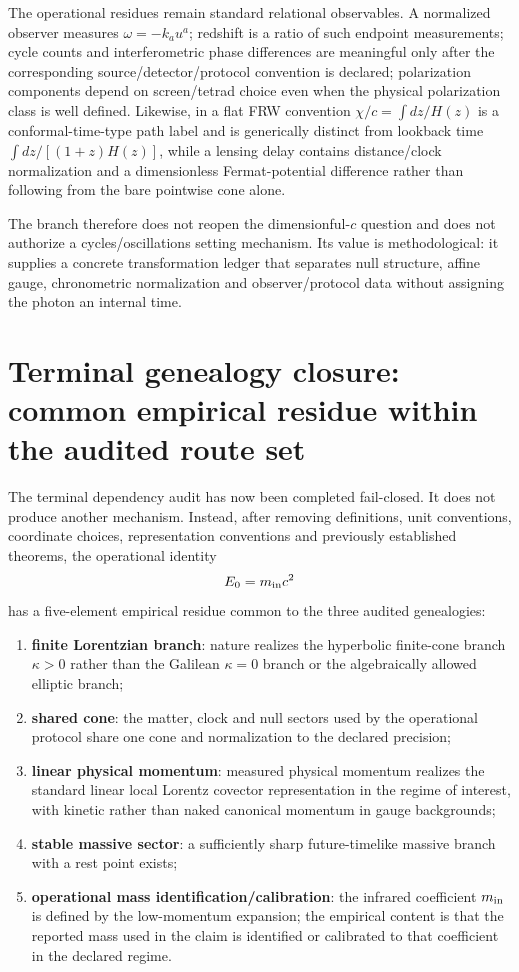 \documentclass[11pt,a4paper]{article}
\begin{document}
The operational residues remain standard relational observables.  A normalized observer measures $\omega=-k_au^a$; redshift is a ratio of such endpoint measurements; cycle counts and interferometric phase differences are meaningful only after the corresponding source/detector/protocol convention is declared; polarization components depend on screen/tetrad choice even when the physical polarization class is well defined.  Likewise, in a flat FRW convention $\chi/c=\int dz/H(z)$ is a conformal-time-type path label and is generically distinct from lookback time $\int dz/[(1+z)H(z)]$, while a lensing delay contains distance/clock normalization and a dimensionless Fermat-potential difference rather than following from the bare pointwise cone alone.

The branch therefore does not reopen the dimensionful-$c$ question and does not authorize a cycles/oscillations setting mechanism.  Its value is methodological: it supplies a concrete transformation ledger that separates null structure, affine gauge, chronometric normalization and observer/protocol data without assigning the photon an internal time.

\section{Terminal genealogy closure: common empirical residue within the audited route set}
\label{sec:terminal-genealogy}
The terminal dependency audit has now been completed fail-closed. It does not produce another mechanism. Instead, after removing definitions, unit conventions, coordinate choices, representation conventions and previously established theorems, the operational identity
\begin{equation}
E_0=m_{\rm in}c^2
\end{equation}
has a five-element empirical residue common to the three audited genealogies:
\begin{enumerate}
\item \textbf{finite Lorentzian branch}: nature realizes the hyperbolic finite-cone branch $\kappa>0$ rather than the Galilean $\kappa=0$ branch or the algebraically allowed elliptic branch;
\item \textbf{shared cone}: the matter, clock and null sectors used by the operational protocol share one cone and normalization to the declared precision;
\item \textbf{linear physical momentum}: measured physical momentum realizes the standard linear local Lorentz covector representation in the regime of interest, with kinetic rather than naked canonical momentum in gauge backgrounds;
\item \textbf{stable massive sector}: a sufficiently sharp future-timelike massive branch with a rest point exists;
\item \textbf{operational mass identification/calibration}: the infrared coefficient $m_{\rm in}$ is defined by the low-momentum expansion; the empirical content is that the reported mass used in the claim is identified or calibrated to that coefficient in the declared regime.
\end{enumerate}
\end{document}
